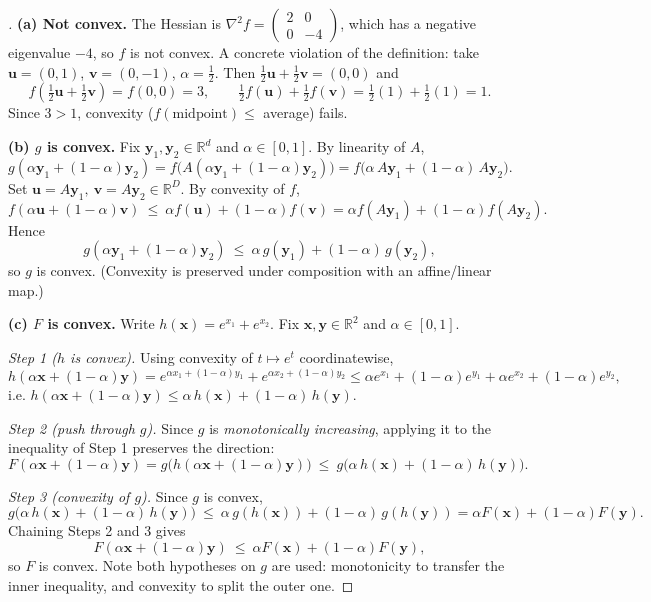 \documentclass[en,hazy,blue,12pt,normal]{../../elegantnote}
\begin{document}
\begin{proof}[\solutionname]
\textbf{(a) Not convex.}\;
The Hessian is $\nabla^2 f=\left(\begin{smallmatrix}2&0\\0&-4\end{smallmatrix}\right)$, which has a negative
eigenvalue $-4$, so $f$ is not convex. A concrete violation of the definition: take
$\bm u=(0,1)$, $\bm v=(0,-1)$, $\alpha=\tfrac12$. Then $\tfrac12\bm u+\tfrac12\bm v=(0,0)$ and
\[
f\!\left(\tfrac12\bm u+\tfrac12\bm v\right)=f(0,0)=3,
\qquad
\tfrac12 f(\bm u)+\tfrac12 f(\bm v)=\tfrac12(1)+\tfrac12(1)=1 .
\]
Since $3>1$, convexity ($f(\text{midpoint})\le$ average) fails.

\medskip
\textbf{(b) $g$ is convex.}\;
Fix $\bm y_1,\bm y_2\in\mathbb R^d$ and $\alpha\in[0,1]$. By linearity of $A$,
\[
g(\alpha\bm y_1+(1-\alpha)\bm y_2)
= f\!\big(A(\alpha\bm y_1+(1-\alpha)\bm y_2)\big)
= f\!\big(\alpha\,A\bm y_1+(1-\alpha)\,A\bm y_2\big).
\]
Set $\bm u=A\bm y_1,\ \bm v=A\bm y_2\in\mathbb R^D$. By convexity of $f$,
\[
f(\alpha\bm u+(1-\alpha)\bm v)\ \le\ \alpha f(\bm u)+(1-\alpha)f(\bm v)
= \alpha f(A\bm y_1)+(1-\alpha)f(A\bm y_2).
\]
Hence
\[
g(\alpha\bm y_1+(1-\alpha)\bm y_2)\ \le\ \alpha\,g(\bm y_1)+(1-\alpha)\,g(\bm y_2),
\]
so $g$ is convex. (Convexity is preserved under composition with an affine/linear map.)

\medskip
\textbf{(c) $F$ is convex.}\;
Write $h(\bm x)=e^{x_1}+e^{x_2}$. Fix $\bm x,\bm y\in\mathbb R^2$ and $\alpha\in[0,1]$.

\emph{Step 1 ($h$ is convex).} Using convexity of $t\mapsto e^{t}$ coordinatewise,
\[
h(\alpha\bm x+(1-\alpha)\bm y)
= e^{\alpha x_1+(1-\alpha)y_1}+e^{\alpha x_2+(1-\alpha)y_2}
\le \alpha e^{x_1}+(1-\alpha)e^{y_1}+\alpha e^{x_2}+(1-\alpha)e^{y_2},
\]
i.e. $h(\alpha\bm x+(1-\alpha)\bm y)\le \alpha\,h(\bm x)+(1-\alpha)\,h(\bm y)$.

\emph{Step 2 (push through $g$).} Since $g$ is \emph{monotonically increasing}, applying it to the
inequality of Step 1 preserves the direction:
\[
F(\alpha\bm x+(1-\alpha)\bm y)=g\big(h(\alpha\bm x+(1-\alpha)\bm y)\big)
\ \le\ g\big(\alpha\,h(\bm x)+(1-\alpha)\,h(\bm y)\big).
\]

\emph{Step 3 (convexity of $g$).} Since $g$ is convex,
\[
g\big(\alpha\,h(\bm x)+(1-\alpha)\,h(\bm y)\big)
\ \le\ \alpha\,g(h(\bm x))+(1-\alpha)\,g(h(\bm y))
= \alpha F(\bm x)+(1-\alpha)F(\bm y).
\]
Chaining Steps 2 and 3 gives
\[
F(\alpha\bm x+(1-\alpha)\bm y)\ \le\ \alpha F(\bm x)+(1-\alpha)F(\bm y),
\]
so $F$ is convex. Note both hypotheses on $g$ are used: monotonicity to transfer the inner
inequality, and convexity to split the outer one.
\end{proof}
\end{document}

